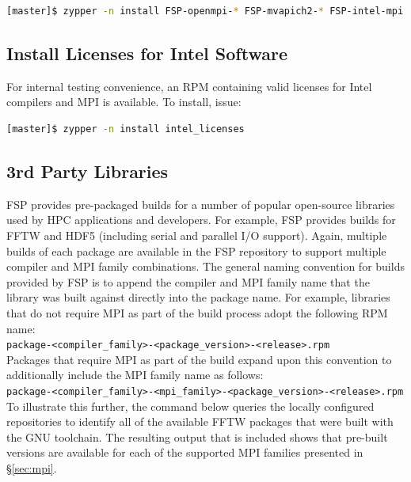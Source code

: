 \documentclass[letterpaper]{article}
\begin{document}
\begin{lstlisting}[language=bash]
[master]$ zypper -n install FSP-openmpi-* FSP-mvapich2-* FSP-intel-mpi
\end{lstlisting}

\subsection{Install Licenses for Intel Software}

For internal testing convenience, an RPM containing valid licenses for Intel
compilers and MPI is available. To install, issue:

\begin{lstlisting}[language=bash,keywords={},upquote=true]
[master]$ zypper -n install intel_licenses
\end{lstlisting}

\subsection{3rd Party Libraries}

FSP provides pre-packaged builds for a number of popular open-source libraries
used by HPC applications and developers. For example, FSP provides builds for
FFTW and HDF5 (including serial and parallel I/O support). Again, multiple
builds of each package are available in the FSP repository to support multiple
compiler and MPI family combinations. The general naming convention for builds
provided by FSP is to append the compiler and MPI family name that the library
was built against directly into the package name. For example, libraries that
do not require MPI as part of the build process adopt the following RPM
name: \\

\noindent
\texttt{package-<compiler\_family>-<package\_version>-<release>.rpm} \\

\noindent Packages that require MPI as part of the build expand upon this convention to
additionally include the MPI family name as follows: \\

\noindent
\texttt{package-<compiler\_family>-<mpi\_family>-<package\_version>-<release>.rpm} \\

To illustrate this further, the command below queries the locally configured
repositories to identify all of the available FFTW packages that were built
with the GNU toolchain. The resulting output that is included shows that
pre-built versions are available for each of the supported MPI families
presented in \S\ref{sec:mpi}.
\end{document}
